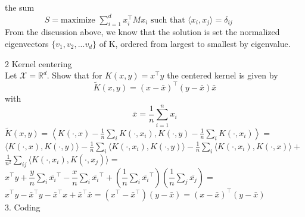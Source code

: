 \documentclass[18pt]{article}
\begin{document}
\begin{flushleft}
the sum\\
\vspace{.4cm}
$\hspace{2cm} S= \text{maximize } \sum\limits_{i=1}^d x_i^{\top}Mx_i \text{  such that }\langle x_i,x_j \rangle=\delta_{ij}$\\
\vspace{.4cm}
From the discussion above, we know that the solution is set the normalized\\
eigenvectors $\{v_1,v_2,...v_d\}$ of K, ordered from largest to smallest by eigenvalue.\\
\vspace{.4cm}


2 Kernel centering\\
\vspace{.4cm}
Let $\mathcal{X}=\mathbb{R}^d$. Show that for $K(x,y)=x^{\top}y$ the centered kernel is given by\\
$$
\tilde{K}(x,y)=(x-\bar{x})^{\top}(y-\bar{x}) \bar{x}
$$
with
$$\bar{x}=\dfrac{1}{n}\sum\limits_{i=1}^n x_i
$$
\vspace{.4cm}
$\tilde{K}(x,y)=\left\langle K(\cdot,x)-\frac{1}{n}\sum_i K(\cdot,x_i), K(\cdot,y)-\frac{1}{n}\sum_i K(\cdot,x_i)\right\rangle=$\\
$\langle K(\cdot,x),K(\cdot,y)\rangle-\frac{1}{n}\sum\limits_i \langle K(\cdot,x_i),K(\cdot,y) \rangle-\frac{1}{n}\sum\limits_i \langle K(\cdot,x_i),K(\cdot,x) \rangle+$\\
$\frac{1}{n^2}\sum\limits_{ij} \langle K(\cdot,x_i),K(\cdot,x_j) \rangle=$\\
$x^{\top}y+\dfrac{y}{n} \sum\limits_i \bar{x_i}^{\top}-\dfrac{x}{n} \sum\limits_i \bar{x_i}^{\top}+\left( \dfrac{1}{n} \sum\limits_i \bar{x_i}^{\top}\right)\left(\dfrac{1}{n} \sum\limits_j \bar{x_j}\right)=$\\
$x^{\top}y-\bar{x}^{\top}y-\bar{x}^{\top}x+\bar{x}^{\top}\bar{x}=(x^{\top}-\bar{x}^{\top})(y-\bar{x})=(x-\bar{x})^{\top}(y-\bar{x})$\\
\vspace{.4cm}
3. Coding\\



\end{flushleft}
\end{document}
